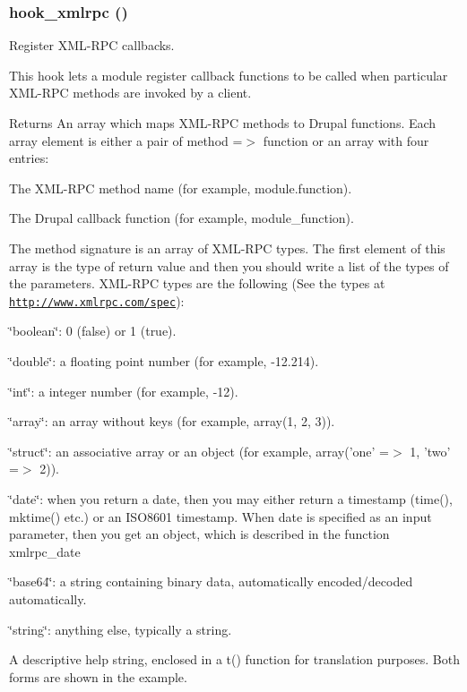 \hypertarget{group__hooks_ga9debe627e55ecff58ffaf71689dbec2e}{
\subsubsection[{hook\_\-xmlrpc}]{\setlength{\rightskip}{0pt plus 5cm}hook\_\-xmlrpc ()}}
\label{group__hooks_ga9debe627e55ecff58ffaf71689dbec2e}
Register XML-\/RPC callbacks.

This hook lets a module register callback functions to be called when particular XML-\/RPC methods are invoked by a client.

\begin{DoxyReturn}{Returns}
An array which maps XML-\/RPC methods to Drupal functions. Each array element is either a pair of method =$>$ function or an array with four entries:
\begin{DoxyItemize}
\item The XML-\/RPC method name (for example, module.function).
\item The Drupal callback function (for example, module\_\-function).
\item The method signature is an array of XML-\/RPC types. The first element of this array is the type of return value and then you should write a list of the types of the parameters. XML-\/RPC types are the following (See the types at \href{http://www.xmlrpc.com/spec}{\tt http://www.xmlrpc.com/spec}):
\begin{DoxyItemize}
\item \char`\"{}boolean\char`\"{}: 0 (false) or 1 (true).
\item \char`\"{}double\char`\"{}: a floating point number (for example, -\/12.214).
\item \char`\"{}int\char`\"{}: a integer number (for example, -\/12).
\item \char`\"{}array\char`\"{}: an array without keys (for example, array(1, 2, 3)).
\item \char`\"{}struct\char`\"{}: an associative array or an object (for example, array('one' =$>$ 1, 'two' =$>$ 2)).
\item \char`\"{}date\char`\"{}: when you return a date, then you may either return a timestamp (time(), mktime() etc.) or an ISO8601 timestamp. When date is specified as an input parameter, then you get an object, which is described in the function xmlrpc\_\-date
\item \char`\"{}base64\char`\"{}: a string containing binary data, automatically encoded/decoded automatically.
\item \char`\"{}string\char`\"{}: anything else, typically a string.
\end{DoxyItemize}
\item A descriptive help string, enclosed in a t() function for translation purposes. Both forms are shown in the example. 
\end{DoxyItemize}
\end{DoxyReturn}
